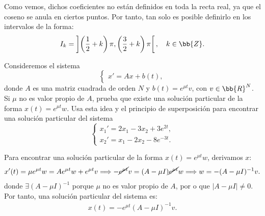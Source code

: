 \begin{ejercicio}
    Como vemos, dichos coeficientes no están definidos en toda la recta real, ya que el coseno se anula en ciertos puntos. Por tanto, tan solo es posible definirlo en los intervalos de la forma:
    \begin{equation*}
        I_k = \left]\left(\frac{1}{2} + k\right)\pi, \left(\frac{3}{2} + k\right)\pi\right[,\quad k\in \bb{Z}.
    \end{equation*}
\end{ejercicio}

\begin{ejercicio}\label{ej:5.4}
    Consideremos el sistema
    \[
        \begin{cases}
            x' = Ax + b(t),
        \end{cases}
    \]
    donde $A$ es una matriz cuadrada de orden $N$ y $b(t) = e^{\mu t}v$, con $v \in \bb{R}^N$. Si $\mu$ no es valor propio de $A$, prueba que existe una solución particular de la forma $x(t) = e^{\mu t}w$. Usa esta idea y el principio de superposición para encontrar una solución particular del sistema
    \[
        \begin{cases}
            x_1' = 2x_1 - 3x_2 + 3e^{2t},\\
            x_2' = x_1 - 2x_2 - 8e^{-3t}.
        \end{cases}
    \]

    Para encontrar una solución particular de la forma $x(t) = e^{\mu t}w$, derivamos $x$:
    \begin{align*}
        x'(t)= \mu e^{\mu t}w
        = A e^{\mu t}w + e^{\mu t}v
        \Longrightarrow
        -\cancel{e^{\mu t}}v = (A - \mu I)\cancel{e^{\mu t}}w
        \Longrightarrow
        w = -(A - \mu I)^{-1}v.
    \end{align*}
    donde $\exists (A - \mu I)^{-1}$ porque $\mu$ no es valor propio de $A$, por o que $|A - \mu I|\neq 0$. Por tanto, una solución particular del sistema es:
    \begin{align*}
        x(t) = -e^{\mu t} (A - \mu I)^{-1}v.
    \end{align*}

\end{ejercicio}

